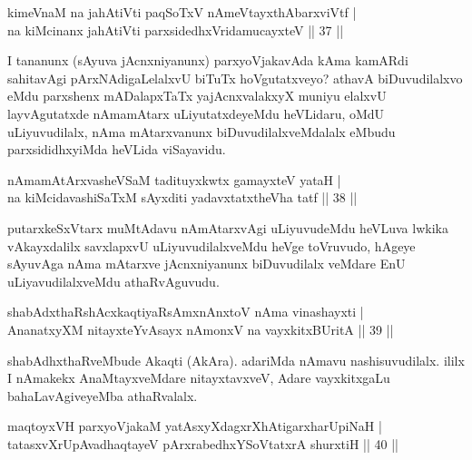 \begin{shl}
kimeVnaM na ja{\null}hAtiVti paqSoTxV nAmeVtayxthAbarxviVtf |\\
na kiMcinanx ja{\null}hAtiVti parxsidedhxVridamucayxteV \hfill || 37 ||
\end{shl}

\begin{artha}
I tananunx (sAyuva jAcnxniyanunx) parxyoVjakavAda kAma kamARdi sahitavAgi pArxNAdigaLelalxvU biTuTx hoVgutatxveyo? athavA biDuvudilalxvo eMdu parxshenx mADalapxTaTx yajAcnxvalakxyX muniyu elalxvU layvAgutatxde nAmamAtarx uLiyutatxdeyeMdu heVLidaru, oMdU uLiyuvudilalx, nAma mAtarxvanunx biDuvudilalxveMdalalx eMbudu parxsididhxyiMda heVLida viSayavidu.
\end{artha}

\begin{shl}
nAmamAtArxvasheVSaM tadituyxkwtx gamayxteV yataH |\\
na kiMcidavashiSaTxM sAyxditi yadavxtatxtheVha tatf \hfill || 38 ||
\end{shl}

\begin{artha}
putarxkeSxVtarx muMtAdavu nAmAtarxvAgi uLiyuvudeMdu heVLuva lwkika vAkayxdalilx savxlapxvU uLiyuvudilalxveMdu heVge toVruvudo, hAgeye sAyuvAga nAma mAtarxve jAcnxniyanunx biDuvudilalx veMdare EnU uLiyavudilalxveMdu athaRvAguvudu.
\end{artha}


\begin{shl}
shabAdxthaRshAcx\s \s kaqtiyaRsAmxnAnxtoV nAma vinashayxti |\\
AnanatxyXM nitayxteYvAsayx nAmonxV na vayxkitxBUritA \hfill || 39 ||
\end{shl}

\begin{artha}
shabAdhxthaRveMbude Akaqti (AkAra). adariMda nAmavu nashisuvudilalx. ililx I nAmakekx AnaMtayxveMdare nitayxtavxveV, Adare vayxkitxgaLu bahaLavAgiveyeMba athaRvalalx.
\end{artha}


\begin{shl}
maqtoyxVH parxyoVjakaM yatAsxyXdagxrXhAtigarxharUpiNaH |\\
tatasxvXrUpAvadhaqtayeV pArxrabedhxYSoVtatxrA shurxtiH \hfill || 40 ||
\end{shl}

